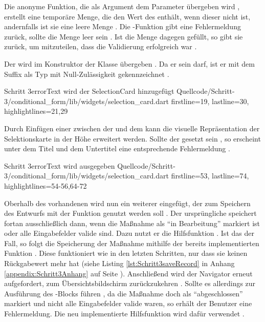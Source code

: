 Die anonyme Funktion, die als Argument dem Parameter  übergeben wird , erstellt eine temporäre Menge, die den Wert des  enthält, wenn dieser nicht  ist, andernfalls ist sie eine leere Menge .
Die -Funktion gibt eine Fehlermeldung zurück, sollte die Menge leer sein .
Ist die Menge dagegen gefüllt, so gibt sie  zurück, um mitzuteilen, dass die Validierung erfolgreich war .



Der  wird im Konstruktor der Klasse  übergeben .
Da er  sein darf, ist er mit dem Suffix  als Typ mit Null-Zulässigkeit gekennzeichnet .

\begin{alexlisting}{Schritt 3}{errorText wird der SelectionCard hinzugefügt}
    {Quellcode/Schritt-3/conditional_form/lib/widgets/selection_card.dart}
    {firstline=19, lastline=30, highlightlines={21,29}}
    \label{lst:Schritt3errorText}
\end{alexlisting}

Durch Einfügen einer  zwischen der   und dem   kann die visuelle Repräsentation der Selektionskarte in der Höhe erweitert werden.
Sollte der  gesetzt sein , so erscheint unter dem Titel und dem Untertitel eine entsprechende Fehlermeldung .
 

\begin{alexlisting}{Schritt 3}{errorText wird ausgegeben}
    {Quellcode/Schritt-3/conditional_form/lib/widgets/selection_card.dart}
    {firstline=53, lastline=74, highlightlines={54-56,64-72}}
    \label{lst:Schritt3ColumnErrorText}
\end{alexlisting}

Oberhalb des vorhandenen  wird nun ein weiterer eingefügt, der zum Speichern des Entwurfs mit der Funktion  genutzt werden soll .
Der ursprüngliche  speichert fortan ausschließlich dann, wenn die Maßnahme als \enquote{in Bearbeitung} markiert ist oder alle Eingabefelder valide sind.
Dazu nutzt er die Hilfsfunktion  .
Ist das der Fall, so folgt die Speicherung der Maßnahme mithilfe der bereits implementierten Funktion  .
Diese funktioniert wie in den letzten Schritten, nur dass sie keinen Rückgabewert mehr hat (siehe Listing \ref{lst:Schritt3saveRecord} in Anhang \ref{appendix:Schritt3Anhang} auf Seite \pageref{appendix:Schritt3Anhang}).
Anschließend wird der Navigator erneut aufgefordert, zum Übersichtsbildschirm zurückzukehren .
Sollte es allerdings zur Ausführung des -Blocks führen ,
da die Maßnahme doch als \enquote{abgeschlossen} markiert und nicht alle Eingabefelder valide waren,
so erhält der Benutzer eine Fehlermeldung. Die neu implementierte Hilfsfunktion  wird dafür verwendet . 
   
